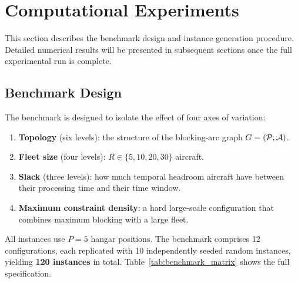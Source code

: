 \section{Computational Experiments}
\label{sec:experiments}

This section describes the benchmark design and instance generation procedure.
Detailed numerical results will be presented in subsequent sections once the
full experimental run is complete.

\subsection{Benchmark Design}
\label{sec:benchmark_design}

The benchmark is designed to isolate the effect of four axes of variation:
\begin{enumerate}
  \item \textbf{Topology} (six levels): the structure of the blocking-arc graph
        $G = (\mathcal{P}, \mathcal{A})$.
  \item \textbf{Fleet size} (four levels): $R \in \{5, 10, 20, 30\}$ aircraft.
  \item \textbf{Slack} (three levels): how much temporal headroom aircraft have
        between their processing time and their time window.
  \item \textbf{Maximum constraint density}: a hard large-scale configuration
        that combines maximum blocking with a large fleet.
\end{enumerate}

All instances use $P = 5$ hangar positions.  The benchmark comprises
12 configurations, each replicated with 10 independently seeded random
instances, yielding \textbf{120 instances} in total.
Table~\ref{tab:benchmark_matrix} shows the full specification.

